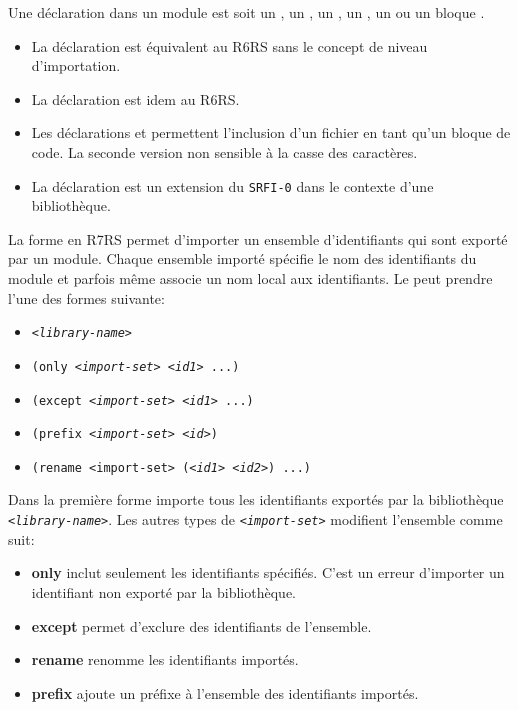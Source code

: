 Une déclaration dans un module est soit un , un ,
un , un , un  ou un
bloque .
\begin{itemize}
  \item La déclaration  est équivalent au R6RS sans le concept
    de niveau d'importation.

  \item La déclaration  est idem au R6RS.

  \item Les déclarations  et  permettent
    l'inclusion d'un fichier en tant qu'un bloque de code.  La seconde version
    non sensible à la casse des caractères.

  \item La déclaration  est un extension du \texttt{SRFI-0}
    dans le contexte d'une bibliothèque.

\end{itemize}

La forme  en R7RS permet d'importer un ensemble d'identifiants
qui sont exporté par un module. Chaque ensemble importé spécifie le nom des
identifiants du module et parfois même associe un nom local aux identifiants.
Le  peut prendre l'une des formes suivante:
\begin{itemize}
  \label{itm:import-set}
  \item \texttt{\textit{<library-name>}}
  \item \texttt{(only \textit{<import-set>} \textit{<id1>} ...)}
  \item \texttt{(except \textit{<import-set>} \textit{<id1>} ...)}
  \item \texttt{(prefix \textit{<import-set>} \textit{<id>})}
  \item \texttt{(rename <import-set> (\textit{<id1>} \textit{<id2>}) ...)}
\end{itemize}


Dans la première forme importe tous les identifiants exportés par
la bibliothèque \texttt{\textit{<library-name>}}. Les autres types de
\texttt{\textit{<import-set>}} modifient l'ensemble comme suit:

\begin{itemize}
  \item \textbf{only} inclut seulement les identifiants spécifiés. C'est un
    erreur d'importer un identifiant non exporté par la bibliothèque.

  \item \textbf{except} permet d'exclure des identifiants de l'ensemble.

  \item \textbf{rename} renomme les identifiants importés.

  \item \textbf{prefix} ajoute un préfixe à l'ensemble des identifiants
    importés.
\end{itemize}

